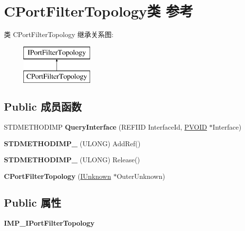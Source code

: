 \hypertarget{class_c_port_filter_topology}{}\section{C\+Port\+Filter\+Topology类 参考}
\label{class_c_port_filter_topology}
类 C\+Port\+Filter\+Topology 继承关系图\+:\begin{figure}[H]
\begin{center}
\leavevmode
\includegraphics[height=2.000000cm]{class_c_port_filter_topology}
\end{center}
\end{figure}
\subsection*{Public 成员函数}
\begin{DoxyCompactItemize}
\item 
\mbox{\label{class_c_port_filter_topology_a7875c060fc362e378a06fa21eb204c2f}} 
S\+T\+D\+M\+E\+T\+H\+O\+D\+I\+MP {\bfseries Query\+Interface} (R\+E\+F\+I\+ID Interface\+Id, \hyperlink{interfacevoid}{P\+V\+O\+ID} $\ast$Interface)
\item 
\mbox{\label{class_c_port_filter_topology_a2a8c37b77f8154199eac791a182fc502}} 
{\bfseries S\+T\+D\+M\+E\+T\+H\+O\+D\+I\+M\+P\+\_\+} (U\+L\+O\+NG) Add\+Ref()
\item 
\mbox{\label{class_c_port_filter_topology_adef50700c18af7b8b213a8ddd49eedcf}} 
{\bfseries S\+T\+D\+M\+E\+T\+H\+O\+D\+I\+M\+P\+\_\+} (U\+L\+O\+NG) Release()
\item 
\mbox{\label{class_c_port_filter_topology_a4410150e4c89c2c8da176d37e154b122}} 
{\bfseries C\+Port\+Filter\+Topology} (\hyperlink{interface_i_unknown}{I\+Unknown} $\ast$Outer\+Unknown)
\end{DoxyCompactItemize}
\subsection*{Public 属性}
\begin{DoxyCompactItemize}
\item 
\mbox{\label{class_c_port_filter_topology_ac2c25c08fd991facc312c186206f3634}} 
{\bfseries I\+M\+P\+\_\+\+I\+Port\+Filter\+Topology}
\end{DoxyCompactItemize}
